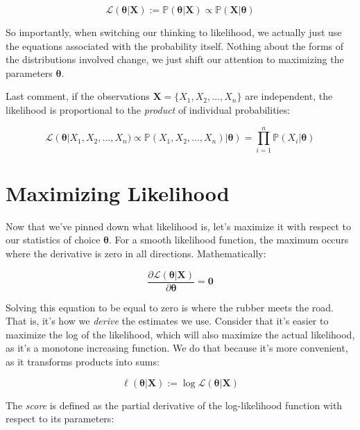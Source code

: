 \documentclass{article}
\begin{document}
\begin{equation}
\mathcal{L}(\boldsymbol{\theta}|\mathbf{X}) := \mathbb{P}(\boldsymbol{\theta}|\mathbf{X}) \propto \mathbb{P}(\mathbf{X}|\boldsymbol{\theta})
\end{equation}

So importantly, when switching our thinking to likelihood, we actually just use the equations associated with the probability itself. Nothing about the forms of the distributions involved change, we just shift our attention to maximizing the parameters $\boldsymbol{\theta}$.

Last comment, if the observations $\mathbf{X} = \{X_1, X_2, ..., X_n\}$ are independent, the likelihood is proportional to the \textit{product} of individual probabilities:

\begin{equation}
\mathcal{L}(\boldsymbol{\theta}|X_1, X_2, ..., X_n) \propto \mathbb{P}(X_1, X_2, ..., X_n)|\boldsymbol{\theta}) = \prod_{i=1}^n \mathbb{P}(X_i|\boldsymbol{\theta})
\end{equation}

\section{Maximizing Likelihood}

Now that we've pinned down what likelihood is, let's maximize it with respect to our statistics of choice $\boldsymbol{\theta}$. For a smooth likelihood function, the maximum occurs where the derivative is zero in all directions. Mathematically:

\begin{equation}
\frac{\partial \mathcal{L}(\boldsymbol{\theta}|\mathbf{X})}{\partial \boldsymbol{\theta}} = \mathbf{0}
\end{equation}

Solving this equation to be equal to zero is where the rubber meets the road. That is, it's how we \textit{derive} the estimates we use. Consider that it's easier to maximize the log of the likelihood, which will also maximize the actual likelihood, as it's a monotone increasing function. We do that because it's more convenient, as it transforms products into sums:

\begin{equation}
\ell(\boldsymbol{\theta}|\mathbf{X}) := \log \mathcal{L}(\boldsymbol{\theta}|\mathbf{X})
\end{equation}

The \textit{score} is defined as the partial derivative of the log-likelihood function with respect to its parameters:
\end{document}
